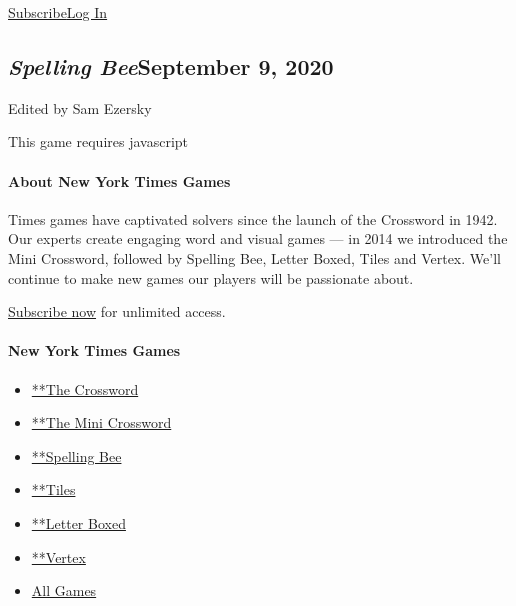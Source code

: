 \href{https://www.nytimes3xbfgragh.onion/subscription/games?campaignId=4QHQ8}{Subscribe}\href{https://myaccount.nytimes3xbfgragh.onion/auth/login?redirect_uri=https\%3A\%2F\%2Fwww.nytimes3xbfgragh.onion\%2Fpuzzles\%2Fspelling-bee\&response_type=cookie\&client_id=games\&application=crosswords\&asset=navigation-bar}{Log
In}

\hypertarget{spelling-beeseptember-9-2020}{%
\subsection{\texorpdfstring{\emph{Spelling Bee}September 9,
2020}{Spelling BeeSeptember 9, 2020}}\label{spelling-beeseptember-9-2020}}

Edited by Sam Ezersky

This game requires javascript

\hypertarget{about-new-york-times-games}{%
\paragraph{About New York Times
Games}\label{about-new-york-times-games}}

Times games have captivated solvers since the launch of the Crossword in
1942. Our experts create engaging word and visual games --- in 2014 we
introduced the Mini Crossword, followed by Spelling Bee, Letter Boxed,
Tiles and Vertex. We'll continue to make new games our players will be
passionate about.

\href{https://www.nytimes3xbfgragh.onion/subscription/games?campaignId=9W9LL}{Subscribe
now} for unlimited access.

\hypertarget{new-york-times-games-1}{%
\paragraph{New York Times Games}\label{new-york-times-games-1}}

\begin{itemize}
\tightlist
\item
  \href{/crosswords/game/daily}{**The Crossword}
\item
  \href{/crosswords/game/mini}{**The Mini Crossword}
\item
  \href{/puzzles/spelling-bee}{**Spelling Bee}
\item
  \href{/puzzles/tiles}{**Tiles}
\item
  \href{/puzzles/letter-boxed}{**Letter Boxed}
\item
  \href{/puzzles/vertex}{**Vertex}
\item
  \href{/crosswords}{All Games}
\end{itemize}


